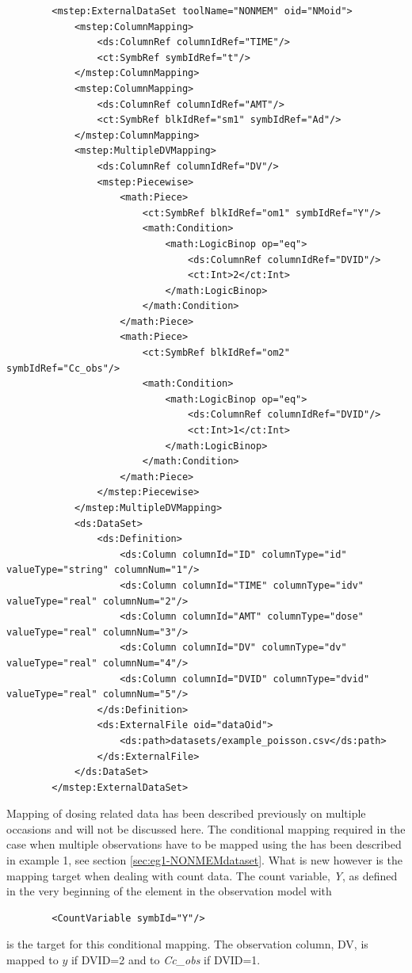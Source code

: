 \lstset{language=XML}
\begin{lstlisting}
        <mstep:ExternalDataSet toolName="NONMEM" oid="NMoid">
            <mstep:ColumnMapping>
                <ds:ColumnRef columnIdRef="TIME"/>
                <ct:SymbRef symbIdRef="t"/>
            </mstep:ColumnMapping>
            <mstep:ColumnMapping>
                <ds:ColumnRef columnIdRef="AMT"/>
                <ct:SymbRef blkIdRef="sm1" symbIdRef="Ad"/>
            </mstep:ColumnMapping>
            <mstep:MultipleDVMapping>
                <ds:ColumnRef columnIdRef="DV"/>
                <mstep:Piecewise>
                    <math:Piece>
                        <ct:SymbRef blkIdRef="om1" symbIdRef="Y"/>
                        <math:Condition>
                            <math:LogicBinop op="eq">
                                <ds:ColumnRef columnIdRef="DVID"/>
                                <ct:Int>2</ct:Int>
                            </math:LogicBinop>
                        </math:Condition>
                    </math:Piece>
                    <math:Piece>
                        <ct:SymbRef blkIdRef="om2" symbIdRef="Cc_obs"/>
                        <math:Condition>
                            <math:LogicBinop op="eq">
                                <ds:ColumnRef columnIdRef="DVID"/>
                                <ct:Int>1</ct:Int>
                            </math:LogicBinop>
                        </math:Condition>
                    </math:Piece>
                </mstep:Piecewise>
            </mstep:MultipleDVMapping>
            <ds:DataSet>
                <ds:Definition>
                    <ds:Column columnId="ID" columnType="id" valueType="string" columnNum="1"/>
                    <ds:Column columnId="TIME" columnType="idv" valueType="real" columnNum="2"/>
                    <ds:Column columnId="AMT" columnType="dose" valueType="real" columnNum="3"/>
                    <ds:Column columnId="DV" columnType="dv" valueType="real" columnNum="4"/>
                    <ds:Column columnId="DVID" columnType="dvid" valueType="real" columnNum="5"/>
                </ds:Definition>
                <ds:ExternalFile oid="dataOid">
                    <ds:path>datasets/example_poisson.csv</ds:path>
                </ds:ExternalFile>
            </ds:DataSet>
        </mstep:ExternalDataSet>
\end{lstlisting}

Mapping of dosing related data has been described previously on
multiple occasions and will not be discussed here. The conditional mapping required 
in the case when multiple observations have to be mapped using the 
has been described in example 1, see section \ref{sec:eg1-NONMEMdataset}. 
What is new however is the mapping target when dealing with count data.
The count variable, \emph{Y}, as defined in the very beginning of the  element
in the observation model  with
\lstset{language=XML}
\begin{lstlisting}
		<CountVariable symbId="Y"/>
\end{lstlisting}
is the target for this conditional mapping. The observation column, DV, is mapped to $y$ if DVID=2 and
to \emph{Cc\_obs} if DVID=1.




